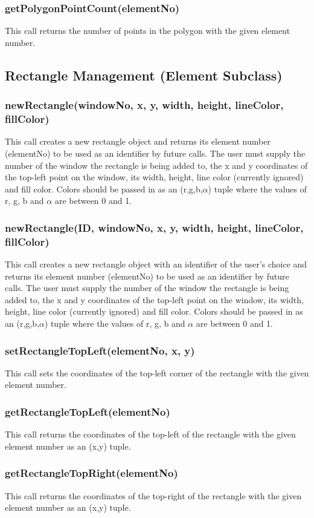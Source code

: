 \documentclass{acm_proc_article-sp}
\begin{document}
\subsubsection{getPolygonPointCount(elementNo)}
This call returns the number of points in the polygon with the given element number.
\subsection{Rectangle Management (Element Subclass)}
\subsubsection{newRectangle(windowNo, x, y, width, height, lineColor, fillColor)}
This call creates a new rectangle object and returns its element number (elementNo) to be used as an identifier by future calls. The user must supply the number of the window the rectangle is being added to, the x and y coordinates of the top-left point on the window, its width, height, line color (currently ignored) and fill color. Colors should be passed in as an (r,g,b,$\alpha$) tuple where the values of r, g, b and $\alpha$ are between 0 and 1.
\subsubsection{newRectangle(ID, windowNo, x, y, width, height, lineColor, fillColor)}
This call creates a new rectangle object with an identifier of the user's choice and returns its element number (elementNo) to be used as an identifier by future calls. The user must supply the number of the window the rectangle is being added to, the x and y coordinates of the top-left point on the window, its width, height, line color (currently ignored) and fill color. Colors should be passed in as an (r,g,b,$\alpha$) tuple where the values of r, g, b and $\alpha$ are between 0 and 1.
\subsubsection{setRectangleTopLeft(elementNo, x, y)}
This call sets the coordinates of the top-left corner of the rectangle with the given element number.
\subsubsection{getRectangleTopLeft(elementNo)}
This call returns the coordinates of the top-left of the rectangle with the given element number as an (x,y) tuple.
\subsubsection{getRectangleTopRight(elementNo)}
This call returns the coordinates of the top-right of the rectangle with the given element number as an (x,y) tuple.
\end{document}
